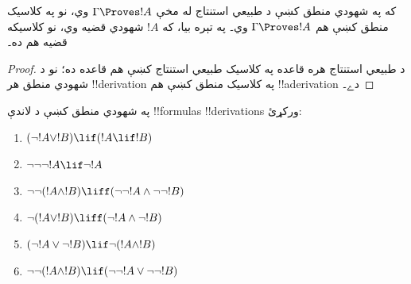 \documentclass[../../../include/open-logic-section]{subfiles}
\begin{document}
\begin{prop}
  که په شهودي منطق کښې د طبيعي استنتاج له مخې $\Gamma \Proves !A$
  وي، نو په کلاسيک منطق کښې هم $\Gamma \Proves !A$ وي۔ په تېره بيا،
  که $!A$ شهودي قضيه وي، نو کلاسيکه قضيه هم ده۔
\end{prop}

\begin{proof}
  د طبيعي استنتاج هره قاعده په کلاسيک طبيعي استنتاج کښې هم قاعده ده؛
  نو د شهودي منطق هر !!{derivation} په کلاسيک منطق کښې هم
  !!a{derivation} دے۔
\end{proof}

\begin{prob}
  په شهودي منطق کښې د لاندې !!{formula}s !!{derivation}s ورکړئ:
  \begin{enumerate}
    \item $(\lnot !A \lor !B) \lif (!A \lif !B)$
    \item $\lnot\lnot\lnot !A \lif \lnot !A$
    \item $\lnot\lnot (!A \land !B) \liff (\lnot\lnot !A\land \lnot \lnot !B)$
    \item $\lnot (!A \lor !B) \liff (\lnot !A \land \lnot !B)$
    \item $(\lnot !A \lor \lnot !B) \lif \lnot (!A \land !B)$
    \item $\lnot\lnot ( !A \land !B) \lif  (\lnot\lnot !A \lor
    \lnot\lnot !B)$
  \end{enumerate}
\end{prob}
\end{document}
